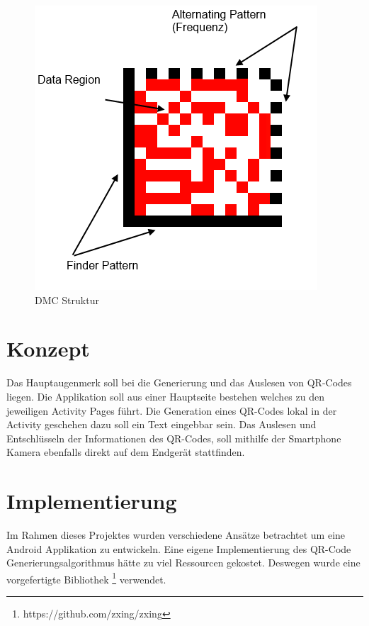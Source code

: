 \documentclass[12pt,					%
							 oneside,			%
							 a4paper,			%
							 halfparskip,		%
							 liststotoc,			%
							 bibtotoc,			%
							 fleqn,				%
							 pointlessnumbers]	%
							 {scrreprt}
\begin{document}
\begin{figure}[ht]
\centering   
	 \includegraphics[scale=0.5]{pictures/dmc} 
 	\caption{DMC Struktur \cite{dmcexample}}
\end{figure}
\chapter{Konzept}
Das Hauptaugenmerk soll bei die Generierung und das Auslesen von QR-Codes liegen. Die Applikation soll aus einer Hauptseite bestehen welches zu den jeweiligen Activity Pages führt. Die Generation eines QR-Codes lokal in der Activity geschehen dazu soll ein Text eingebbar sein. Das Auslesen und Entschlüsseln der Informationen des QR-Codes, soll mithilfe der Smartphone Kamera ebenfalls direkt auf dem Endgerät stattfinden.
\chapter{Implementierung}	
Im Rahmen dieses Projektes wurden verschiedene Ansätze betrachtet um eine Android Applikation zu entwickeln. Eine eigene Implementierung des QR-Code Generierungsalgorithmus hätte zu viel Ressourcen gekostet. Deswegen wurde eine vorgefertigte Bibliothek \footnote{https://github.com/zxing/zxing} verwendet. 
\end{document}
